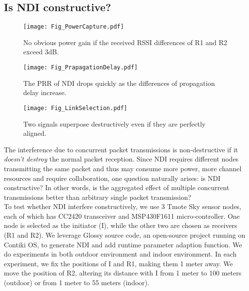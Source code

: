 \documentclass[conference]{IEEEtran}
\begin{document}
\subsection{Is NDI constructive?}
\begin{figure*}[t]
  \centering
  \begin{minipage}[b]{0.32\textwidth}
    \centering
    \texttt{[image: Fig\_PowerCapture.pdf]}
    \caption{No obvious power gain if the received RSSI differences of R1 and R2 exceed 3dB.}
    \label{Fig_PowerCapture}\end{minipage}\hspace{0.01\textwidth}\begin{minipage}[b]{0.32\textwidth}
    \centering
    \texttt{[image: Fig\_PrapagationDelay.pdf]}
    \caption{The PRR of NDI drops quickly as the differences of propagation delay increase.}
    \label{Fig_PrapagationDelay}\end{minipage}\hspace{0.01\linewidth}\begin{minipage}[b]{0.32\textwidth}
    \centering
    \texttt{[image: Fig\_LinkSelection.pdf]}
    \caption{Two signals superpose destructively even if they are perfectly aligned.}
    \label{Fig_LinkSelection}
  \end{minipage}\end{figure*}
\indent The interference due to concurrent packet transmissions is non-destructive if it \emph{doesn't destroy} the normal packet reception.
Since NDI requires different nodes transmitting the same packet and thus may consume more power, more channel resources and require collaboration, one question naturally arises: is NDI constructive?
In other words, is the aggregated effect of multiple concurrent transmissions better than arbitrary single packet transmission?\\
\indent To test whether NDI interfere constructively, we use 3 Tmote Sky sensor nodes, each of which has CC2420 transceiver and MSP430F1611 micro-controller.
One node is selected as the initiator (I), while the other two are chosen as receivers (R1 and R2).
We leverage Glossy source code, an open-source project running on Contiki OS, to generate NDI and
add runtime parameter adaption function.
We do experiments in both outdoor environment and indoor environment.
In each experiment, we fix the positions of I and R1, making them 1 meter away.
We move the position of R2, altering its distance with I from 1 meter to 100 meters (outdoor) or from 1 meter to 55 meters (indoor).
\end{document}
